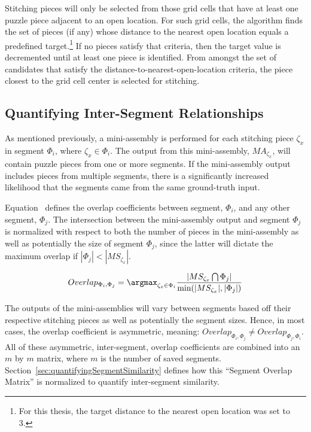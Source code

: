Stitching pieces will only be selected from those grid cells that have at least one puzzle piece adjacent to an open location. For such grid cells, the algorithm finds the set of pieces (if any) whose distance to the nearest open location equals a predefined target.\footnote{For this thesis, the target distance to the nearest open location was set to 3.}  If no pieces satisfy that criteria, then the target value is decremented until at least one piece is identified. From amongst the set of candidates that satisfy the distance-to-nearest-open-location criteria, the piece closest to the grid cell center is selected for stitching. 

\subsection{Quantifying Inter-Segment Relationships}

As mentioned previously, a mini-assembly is performed for each stitching piece $\zeta_x$ in segment $\Phi_i$, where $\zeta_x \in \Phi_i$.  The output from this mini-assembly, $MA_{\zeta_x}$, will contain puzzle pieces from one or more segments.  If the mini-assembly output includes pieces from multiple segments, there is a significantly increased likelihood that the segments came from the same ground-truth input. 

Equation~ defines the overlap coefficients between segment, $\Phi_i$, and any other segment, $\Phi_j$. The intersection between the mini-assembly output and segment $\Phi_j$ is normalized with respect to both the number of pieces in the mini-assembly as well as potentially the size of segment $\Phi_j$, since the latter will dictate the maximum overlap if $|\Phi_j| < |MS_{\zeta_x}|$.  

\begin{equation} \label{eq:segmentOverlap}
  Overlap_{\Phi_i,\Phi_j} = \argmax_{\zeta_x \in \Phi_i} {\frac{|MS_{\zeta_x} \bigcap \Phi_j|}{\text{min}(|MS_{\zeta_x}|, |\Phi_j|)}}
\end{equation}

The outputs of the mini-assemblies will vary between segments based off their respective stitching pieces as well as potentially the segment sizes.  Hence, in most cases, the overlap coefficient is asymmetric, meaning: $Overlap_{\Phi_i,\Phi_j} \neq Overlap_{\Phi_j,\Phi_i}$.  All of these asymmetric, inter-segment, overlap coefficients are combined into an $m$ by $m$ matrix, where $m$ is the number of saved segments.  Section~\ref{sec:quantifyingSegmentSimilarity} defines how this ``Segment Overlap Matrix'' is normalized to quantify inter-segment similarity.  

